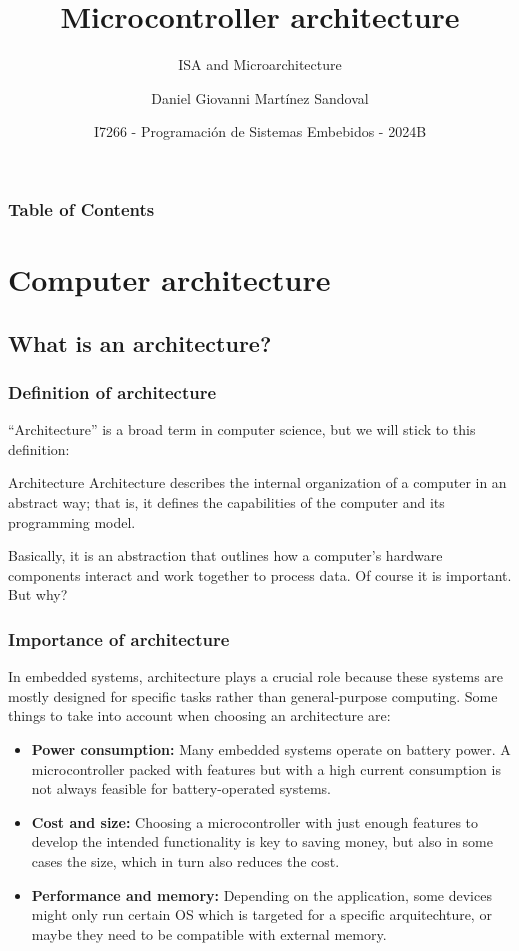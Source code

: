 \documentclass[aspectratio=169]{beamer}
\title[Microcontroller architecture] %
{Microcontroller architecture}
\subtitle{ISA and Microarchitecture}
\author{Daniel Giovanni Martínez Sandoval}
\institute[CUCEI - UDG]
{
  \textsc{
    \textbf{Universidad de Guadalajara}\\
    {\tiny Centro Universitario de Ciencias Exactas e Ingenierías}
  }
}
\date[September 2024] %
{\footnotesize I7266 - Programación de Sistemas Embebidos - 2024B }
\begin{document}
\frame{\titlepage}


\begin{frame}
\frametitle{Table of Contents}
\tableofcontents
\end{frame}


\section{Computer architecture}
\subsection{What is an architecture?}
\begin{frame}
  \frametitle{Definition of architecture}
  ``Architecture'' is a broad term in computer science, but we will stick to this definition: \pause
  \begin{block}{Architecture}
    Architecture describes the internal organization of a computer in an abstract way; that is, it deﬁnes the capabilities of the computer and its programming model.\cite{clements} \pause
  \end{block}
  Basically, it is an abstraction that outlines how a computer's hardware components interact and work together to process data. Of course it is important. But why?
  \end{frame}

\begin{frame}
  \frametitle{Importance of architecture}
  In embedded systems, architecture plays a crucial role because these systems are mostly designed for specific tasks rather than general-purpose computing. Some things to take into account when choosing an architecture are:\pause
  \begin{itemize}
    \item <2-> \textbf{Power consumption:} Many embedded systems operate on battery power. A microcontroller packed with features but with a high current consumption is not always feasible for battery-operated systems. 
    \item <3-> \textbf{Cost and size:} Choosing a microcontroller with just enough features to develop the intended functionality is key to saving money, but also in some cases the size, which in turn also reduces the cost.
    \item <4-> \textbf{Performance and memory:} Depending on the application, some devices might only run certain OS which is targeted for a specific arquitechture, or maybe they need to be compatible with external memory. 
  \end{itemize}
\end{frame}
\end{document}
